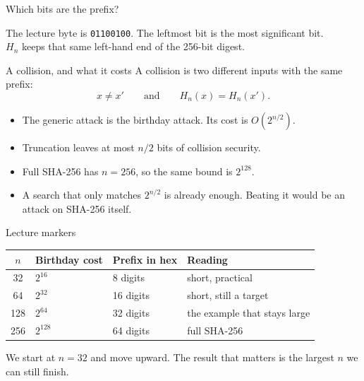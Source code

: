 \documentclass[aspectratio=169,11pt]{beamer}
\newcommand{\Hn}{H_{n}}
\begin{document}
\begin{frame}{Which bits are the prefix?}
  \begin{center}
  \end{center}
  The lecture byte is \texttt{01100100}. The leftmost bit is the most significant bit.\\
  \(\Hn\) keeps that same left-hand end of the 256-bit digest.
\end{frame}

\begin{frame}{A collision, and what it costs}
  A collision is two different inputs with the same prefix:
  \[
    x \neq x' \qquad\text{and}\qquad \Hn(x) = \Hn(x').
  \]
  \begin{itemize}
    \item The generic attack is the birthday attack. Its cost is \(O(2^{n/2})\).
    \item Truncation leaves at most \(n/2\) bits of collision security.
    \item Full SHA-256 has \(n = 256\), so the same bound is \(2^{128}\).
    \item A search that only matches \(2^{n/2}\) is already enough. Beating it would be an attack on SHA-256 itself.
  \end{itemize}
\end{frame}

\begin{frame}{Lecture markers}
  \begin{center}
  \begin{tabular}{@{}clll@{}}
    \toprule
    \(n\) & Birthday cost & Prefix in hex & Reading \\
    \midrule
    32  & \(2^{16}\)  & 8 digits  & short, practical \\
    64  & \(2^{32}\)  & 16 digits & short, still a target \\
    128 & \(2^{64}\)  & 32 digits & the example that stays large \\
    256 & \(2^{128}\) & 64 digits & full SHA-256 \\
    \bottomrule
  \end{tabular}
  \end{center}
  \vspace{0.4em}
  We start at \(n = 32\) and move upward. The result that matters is the largest \(n\) we can still finish.
\end{frame}
\end{document}
